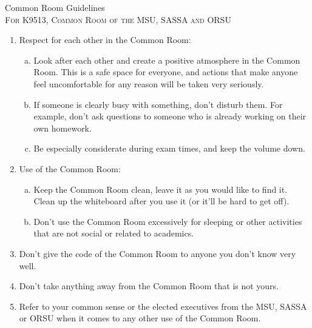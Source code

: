 \documentclass[letter,14pt]{extarticle}
\begin{document}
\begin{center}
  {\Huge \titlefont Common Room Guidelines} \\[1\baselineskip]
  \textsc{For K9513, Common Room of the MSU, SASSA and ORSU}
  
  \vfill
  \vfill
\end{center}

\begin{enumerate}[(1),topsep=0pt]
\item Respect for each other in the Common Room:
  \begin{enumerate}[(a)]
  \item Look after each other and create a positive atmosphere in the Common Room. This is a safe space for everyone, and actions that make anyone feel uncomfortable for any reason will be taken very seriously.
  \item If someone is clearly busy with something, don't disturb them. For example, don't ask questions to someone who is already working on their own homework.
  \item Be especially considerate during exam times, and keep the volume down.
  \end{enumerate}

\item Use of the Common Room:
  \begin{enumerate}[(a)]
  \item Keep the Common Room clean, leave it as you would like to find it. Clean up the whiteboard after you use it (or it'll be hard to get off).
  \item Don't use the Common Room excessively for sleeping or other activities that are not social or related to academics.
  \end{enumerate}

\item Don't give the code of the Common Room to anyone you don't know very well.

\item Don't take anything away from the Common Room that is not yours.

\item Refer to your common sense or the elected executives from the MSU, SASSA or ORSU when it comes to any other use of the Common Room.
\end{enumerate}

\vfill
\end{document}

